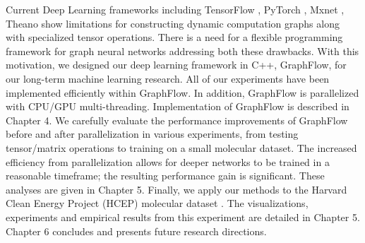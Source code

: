 \documentclass[a4paper]{article}
\begin{document}
Current Deep Learning frameworks including TensorFlow \cite{Google-Research}, PyTorch \cite{PyTorch}, Mxnet \cite{Mxnet}, Theano \cite{Theano} show limitations for constructing dynamic computation graphs along with specialized tensor operations. There is a need for a flexible programming framework for graph neural networks addressing both these drawbacks. With this motivation, we designed our deep learning framework in C++, GraphFlow, for our long-term machine learning research. All of our experiments have been implemented efficiently within GraphFlow. In addition, GraphFlow is parallelized with CPU/GPU multi-threading. Implementation of GraphFlow is described in Chapter 4. We carefully evaluate the performance improvements of GraphFlow before and after parallelization in various experiments, from testing tensor/matrix operations to training on a small molecular dataset. The increased efficiency from parallelization allows for deeper networks to be trained in a reasonable timeframe; the resulting performance gain is significant. These analyses are given in Chapter 5. Finally, we apply our methods to the Harvard Clean Energy Project (HCEP) molecular dataset \cite{Johannes}. The visualizations, experiments and empirical results from this experiment are detailed in Chapter 5. Chapter 6 concludes and presents future research directions.
\end{document}

